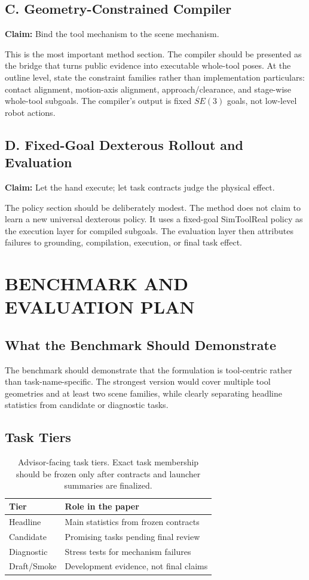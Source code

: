 \documentclass[letterpaper, 10 pt, conference]{ieeeconf}
\newcommand{\claim}[1]{\textbf{Claim:} #1}
\begin{document}
\subsection{C. Geometry-Constrained Compiler}
\claim{Bind the tool mechanism to the scene mechanism.}

This is the most important method section. The compiler should be presented as
the bridge that turns public evidence into executable whole-tool poses. At the
outline level, state the constraint families rather than implementation
particulars: contact alignment, motion-axis alignment, approach/clearance, and
stage-wise whole-tool subgoals. The compiler's output is fixed $SE(3)$ goals,
not low-level robot actions.

\subsection{D. Fixed-Goal Dexterous Rollout and Evaluation}
\claim{Let the hand execute; let task contracts judge the physical effect.}

The policy section should be deliberately modest. The method does not claim to
learn a new universal dexterous policy. It uses a fixed-goal SimToolReal policy
as the execution layer for compiled subgoals. The evaluation layer then
attributes failures to grounding, compilation, execution, or final task effect.

\section{BENCHMARK AND EVALUATION PLAN}

\subsection{What the Benchmark Should Demonstrate}
The benchmark should demonstrate that the formulation is tool-centric rather
than task-name-specific. The strongest version would cover multiple tool
geometries and at least two scene families, while clearly separating headline
statistics from candidate or diagnostic tasks.

\subsection{Task Tiers}
\begin{table}[t]
\caption{Advisor-facing task tiers. Exact task membership should be frozen only
after contracts and launcher summaries are finalized.}
\label{tab:tiers}
\begin{center}
\begin{tabular}{ll}
\toprule
Tier & Role in the paper \\
\midrule
Headline & Main statistics from frozen contracts \\
Candidate & Promising tasks pending final review \\
Diagnostic & Stress tests for mechanism failures \\
Draft/Smoke & Development evidence, not final claims \\
\bottomrule
\end{tabular}
\end{center}
\end{table}
\end{document}
